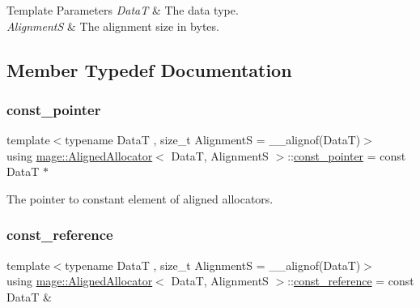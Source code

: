 \begin{DoxyTemplParams}{Template Parameters}
{\em DataT} & The data type. \\
\hline
{\em AlignmentS} & The alignment size in bytes. \\
\hline
\end{DoxyTemplParams}


\subsection{Member Typedef Documentation}
\hypertarget{structmage_1_1_aligned_allocator_a959cb724f93b205c290ff2ecbd146254}{}\label{structmage_1_1_aligned_allocator_a959cb724f93b205c290ff2ecbd146254} 
\subsubsection{\texorpdfstring{const\+\_\+pointer}{const\_pointer}}
{\footnotesize\ttfamily template$<$typename DataT , size\+\_\+t AlignmentS = \+\_\+\+\_\+alignof(\+Data\+T)$>$ \\
using \hyperlink{structmage_1_1_aligned_allocator}{mage\+::\+Aligned\+Allocator}$<$ DataT, AlignmentS $>$\+::\hyperlink{structmage_1_1_aligned_allocator_a959cb724f93b205c290ff2ecbd146254}{const\+\_\+pointer} =  const DataT $\ast$}

The pointer to constant element of aligned allocators. \hypertarget{structmage_1_1_aligned_allocator_a97c3aca3eba1b0a5a6c68d5c444b36e9}{}\label{structmage_1_1_aligned_allocator_a97c3aca3eba1b0a5a6c68d5c444b36e9} 
\subsubsection{\texorpdfstring{const\+\_\+reference}{const\_reference}}
{\footnotesize\ttfamily template$<$typename DataT , size\+\_\+t AlignmentS = \+\_\+\+\_\+alignof(\+Data\+T)$>$ \\
using \hyperlink{structmage_1_1_aligned_allocator}{mage\+::\+Aligned\+Allocator}$<$ DataT, AlignmentS $>$\+::\hyperlink{structmage_1_1_aligned_allocator_a97c3aca3eba1b0a5a6c68d5c444b36e9}{const\+\_\+reference} =  const DataT \&}

